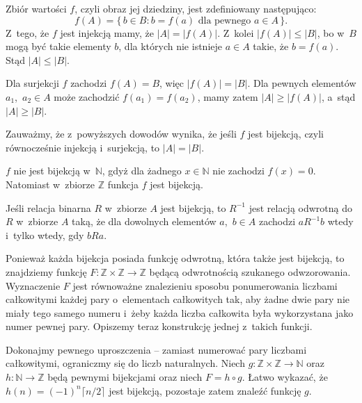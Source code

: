 
\exercise %
\subexercise
Zbiór wartości $f$, czyli obraz jej dziedziny, jest zdefiniowany następująco:
\[
	f(A) = \bigl\{\,b\in B:b=f(a)\text{ dla pewnego $a\in A$}\,\bigr\}.
\]
Z~tego, że $f$ jest injekcją mamy, że $|A|=|f(A)|$. Z~kolei $|f(A)|\le|B|$, bo w~$B$ mogą być takie elementy $b$, dla których nie istnieje $a\in A$ takie, że $b=f(a)$. Stąd $|A|\le|B|$.

\subexercise
Dla surjekcji $f$ zachodzi $f(A)=B$, więc $|f(A)|=|B|$. Dla pewnych elementów $a_1$,~$a_2\in A$ może zachodzić $f(a_1)=f(a_2)$, mamy zatem $|A|\ge|f(A)|$, a~stąd $|A|\ge|B|$.
\bigskip

Zauważmy, że z~powyższych dowodów wynika, że jeśli $f$ jest bijekcją, czyli równocześnie injekcją i~surjekcją, to $|A|=|B|$.

\exercise %
$f$ nie jest bijekcją w~$\mathbb{N}$, gdyż dla żadnego $x\in\mathbb{N}$ nie zachodzi $f(x)=0$. Natomiast w~zbiorze $\mathbb{Z}$ funkcja $f$ jest bijekcją.

\exercise %
Jeśli relacja binarna $R$ w~zbiorze $A$ jest bijekcją, to $R^{-1}$ jest relacją odwrotną do $R$ w~zbiorze $A$ taką, że dla dowolnych elementów $a$,~$b\in A$ zachodzi $aR^{-1}b$ wtedy i~tylko wtedy, gdy $bRa$.

\exercise %
Ponieważ każda bijekcja posiada funkcję odwrotną, która także jest bijekcją, to znajdziemy funkcję $F\colon\mathbb{Z}\times\mathbb{Z}\to\mathbb{Z}$ będącą odwrotnością szukanego odwzorowania. Wyznaczenie $F$ jest równoważne znalezieniu sposobu ponumerowania liczbami całkowitymi każdej pary o~elementach całkowitych tak, aby żadne dwie pary nie miały tego samego numeru i~żeby każda liczba całkowita była wykorzystana jako numer pewnej pary. Opiszemy teraz konstrukcję jednej z~takich funkcji.

Dokonajmy pewnego uproszczenia -- zamiast numerować pary liczbami całkowitymi, ograniczmy się do liczb naturalnych. Niech $g\colon\mathbb{Z}\times\mathbb{Z}\to\mathbb{N}$ oraz $h\colon\mathbb{N}\to\mathbb{Z}$ będą pewnymi bijekcjami oraz niech $F=h\circ g$. Łatwo wykazać, że $h(n)=(-1)^n\lceil n/2\rceil$ jest bijekcją, pozostaje zatem znaleźć funkcję $g$.

